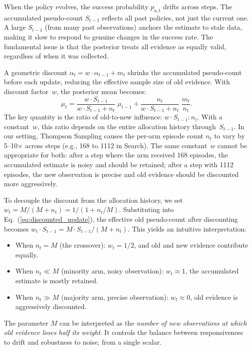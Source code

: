 \documentclass{article}
\theoremstyle{plain}
\theoremstyle{definition}
\theoremstyle{remark}
\begin{document}
When the policy evolves, the success probability $p_{a,t}$ drifts across steps. The accumulated pseudo-count $S_{t-1}$ reflects all past policies, not just the current one. A large $S_{t-1}$ (from many past observations) anchors the estimate to stale data, making it slow to respond to genuine changes in the success rate. The fundamental issue is that the posterior treats all evidence as equally valid, regardless of when it was collected.

A geometric discount $\alpha_t = w \cdot \alpha_{t-1} + m_t$ shrinks the accumulated pseudo-count before each update, reducing the effective sample size of old evidence. With discount factor~$w$, the posterior mean becomes:
\begin{equation}
    \mu_t = \frac{w \cdot S_{t-1}}{w \cdot S_{t-1} + n_t}\;\mu_{t-1} + \frac{n_t}{w \cdot S_{t-1} + n_t}\;\frac{m_t}{n_t}.
    \label{eq:discounted_update}
\end{equation}
The key quantity is the ratio of old-to-new influence: $w \cdot S_{t-1} : n_t$. With a constant~$w$, this ratio depends on the entire allocation history through~$S_{t-1}$. In our setting, Thompson Sampling causes the per-arm episode count $n_t$ to vary by 5--10$\times$ across steps (e.g., 168 to 1112 in Search). The same constant~$w$ cannot be appropriate for both: after a step where the arm received 168 episodes, the accumulated estimate is noisy and should be retained; after a step with 1112 episodes, the new observation is precise and old evidence should be discounted more aggressively.

To decouple the discount from the allocation history, we set $w_t = M/(M + n_t) = 1/(1 + n_t/M)$. Substituting into Eq.~(\ref{eq:discounted_update}), the effective old pseudo-count after discounting becomes $w_t \cdot S_{t-1} = M \cdot S_{t-1}/(M + n_t)$. This yields an intuitive interpretation:
\begin{itemize}[itemsep=2pt, leftmargin=*]
    \item When $n_t = M$ (the crossover): $w_t = 1/2$, and old and new evidence contribute equally.
    \item When $n_t \ll M$ (minority arm, noisy observation): $w_t \approx 1$, the accumulated estimate is mostly retained.
    \item When $n_t \gg M$ (majority arm, precise observation): $w_t \approx 0$, old evidence is aggressively discounted.
\end{itemize}
The parameter $M$ can be interpreted as the \emph{number of new observations at which old evidence loses half its weight}. It controls the balance between responsiveness to drift and robustness to noise, from a single scalar.
\end{document}

